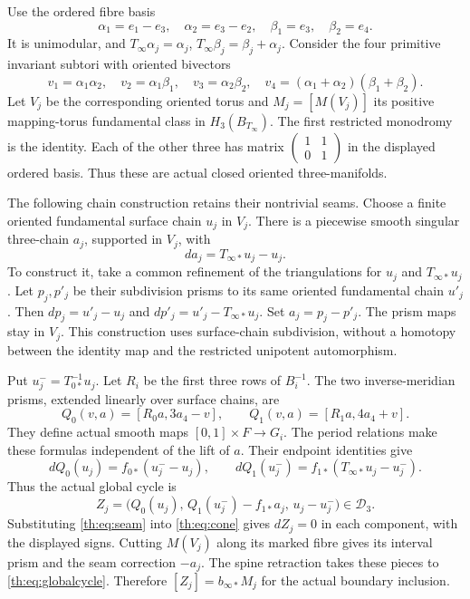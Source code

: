 Use the ordered fibre basis
\[
\alpha_1=e_1-e_3,\quad \alpha_2=e_3-e_2,\quad
\beta_1=e_3,\quad\beta_2=e_4.
\]
It is unimodular, and
$T_\infty\alpha_j=\alpha_j$, $T_\infty\beta_j=\beta_j+\alpha_j$.
Consider the four primitive invariant subtori with oriented bivectors
\begin{equation}\label{th:eq:v}
v_1=\alpha_1\alpha_2,\quad
v_2=\alpha_1\beta_1,\quad
v_3=\alpha_2\beta_2,\quad
v_4=(\alpha_1+\alpha_2)(\beta_1+\beta_2).
\end{equation}
Let $V_j$ be the corresponding oriented torus and $M_j=[M(V_j)]$
its positive mapping-torus fundamental class in $H_3(B_{T_\infty})$.
The first restricted monodromy is the identity.
Each of the other three has matrix
$\left(\begin{smallmatrix}1&1\\0&1\end{smallmatrix}\right)$
in the displayed ordered basis.
Thus these are actual closed oriented three-manifolds.

The following chain construction retains their nontrivial seams.
Choose a finite oriented fundamental surface chain $u_j$ in $V_j$.
There is a piecewise smooth singular three-chain $a_j$, supported in $V_j$, with
\begin{equation}\label{th:eq:seam}
da_j=T_{\infty*}u_j-u_j.
\end{equation}
To construct it, take a common refinement of the triangulations for $u_j$
and $T_{\infty*}u_j$.
Let $p_j,p'_j$ be their subdivision prisms to its same oriented fundamental chain $u'_j$.
Then $dp_j=u'_j-u_j$ and $dp'_j=u'_j-T_{\infty*}u_j$.
Set $a_j=p_j-p'_j$.
The prism maps stay in $V_j$.
This construction uses surface-chain subdivision, without a homotopy between
the identity map and the restricted unipotent automorphism.

Put $u_j^-=T_{0*}^{-1}u_j$.
Let $R_i$ be the first three rows of $B_i^{-1}$.
The two inverse-meridian prisms, extended linearly over surface chains, are
\begin{equation}\label{th:eq:prisms}
Q_0(v,a)=[R_0a,3a_4-v],\qquad
Q_1(v,a)=[R_1a,4a_4+v].
\end{equation}
They define actual smooth maps $[0,1]\times F\to G_i$.
The period relations make these formulas independent of the lift of $a$.
Their endpoint identities give
\[
dQ_0(u_j)=f_{0*}(u_j^--u_j),\qquad
dQ_1(u_j^-)=f_{1*}(T_{\infty*}u_j-u_j^-).
\]
Thus the actual global cycle is
\begin{equation}\label{th:eq:globalcycle}
Z_j=\bigl(Q_0(u_j),\,Q_1(u_j^-)-f_{1*}a_j,\,u_j-u_j^-\bigr)
\in\mathcal D_3.
\end{equation}
Substituting \eqref{th:eq:seam} into \eqref{th:eq:cone} gives $dZ_j=0$
in each component, with the displayed signs.
Cutting $M(V_j)$ along its marked fibre gives its interval prism and the seam correction $-a_j$.
The spine retraction takes these pieces to \eqref{th:eq:globalcycle}.
Therefore $[Z_j]=b_{\infty*}M_j$ for the actual boundary inclusion.

